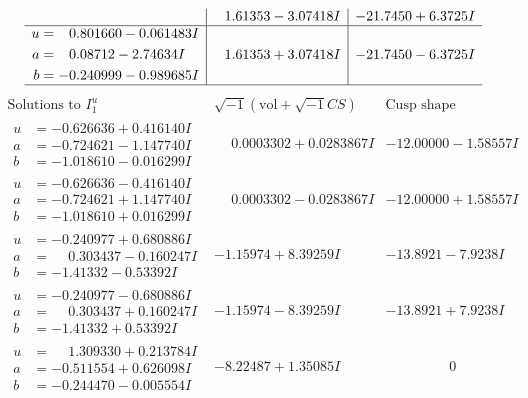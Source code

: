 \documentclass[1p]{elsarticle_modified}
\theoremstyle{definition}
\newcommand{\I}{\sqrt{-1}}
\begin{document}
$$\begin{array}{c|c|c}
 & \phantom{-}1.61353 - 3.07418 I & -21.7450 + 6.3725 I \\ \hline\begin{aligned}
u &= \phantom{-}0.801660 - 0.061483 I \\
a &= \phantom{-}0.08712 - 2.74634 I \\
b &= -0.240999 - 0.989685 I\end{aligned}
 & \phantom{-}1.61353 + 3.07418 I & -21.7450 - 6.3725 I\\
 \hline 
 \end{array}$$\newpage$$\begin{array}{c|c|c}  
\text{Solutions to }I^u_{1}& \I (\text{vol} + \sqrt{-1}CS) & \text{Cusp shape}\\
 \hline 
\begin{aligned}
u &= -0.626636 + 0.416140 I \\
a &= -0.724621 - 1.147740 I \\
b &= -1.018610 - 0.016299 I\end{aligned}
 & \phantom{-}0.0003302 + 0.0283867 I & -12.00000 - 1.58557 I \\ \hline\begin{aligned}
u &= -0.626636 - 0.416140 I \\
a &= -0.724621 + 1.147740 I \\
b &= -1.018610 + 0.016299 I\end{aligned}
 & \phantom{-}0.0003302 - 0.0283867 I & -12.00000 + 1.58557 I \\ \hline\begin{aligned}
u &= -0.240977 + 0.680886 I \\
a &= \phantom{-}0.303437 - 0.160247 I \\
b &= -1.41332 - 0.53392 I\end{aligned}
 & -1.15974 + 8.39259 I & -13.8921 - 7.9238 I \\ \hline\begin{aligned}
u &= -0.240977 - 0.680886 I \\
a &= \phantom{-}0.303437 + 0.160247 I \\
b &= -1.41332 + 0.53392 I\end{aligned}
 & -1.15974 - 8.39259 I & -13.8921 + 7.9238 I \\ \hline\begin{aligned}
u &= \phantom{-}1.309330 + 0.213784 I \\
a &= -0.511554 + 0.626098 I \\
b &= -0.244470 - 0.005554 I\end{aligned}
 & -8.22487 + 1.35085 I & \phantom{-0.000000 } 0 \\ \hline\begin{aligned}

\end{aligned}
\end{array}$$
\end{document}
